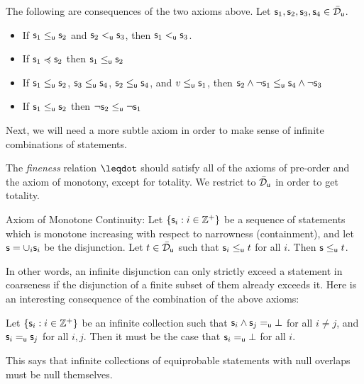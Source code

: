 \documentclass[10pt, onecolumn, longbibliography, nofootinbib]{revtex4-2}
\begin{document}
The following are consequences of the two axioms above. Let $\stmt_1,\stmt_2,\stmt_3,\stmt_4\in \tdomain_{\stmt[u]}$.
\begin{itemize}
    \item If $\stmt_1\leq_{\stmt[u]} \stmt_2$ and $\stmt_2<_{\stmt[u]} \stmt_3$, then $\stmt_1<_{\stmt[u]}\stmt_3$. 
    \item If $\stmt_1\narrower \stmt_2$ then $\stmt_1\leq_{\stmt[u]} \stmt_2$
    \item If $\stmt_1\leq_{\stmt[u]} \stmt_2$, $\stmt_3\leq_{\stmt[u]} \stmt_4$, $\stmt_2\leq_{\stmt[u]} \stmt_4$, and $v\leq_{\stmt[u]} \stmt_1$, then $\stmt_2 \AND \NOT \stmt_1 \leq_{\stmt[u]} \stmt_4 \AND \NOT \stmt_3$
    \item If $\stmt_1\leq_{\stmt[u]} \stmt_2$ then $\NOT \stmt_2 \leq_{\stmt[u]}\NOT \stmt_1$
\end{itemize}

Next, we will need a more subtle axiom in order to make sense of infinite combinations of statements. 

\begin{remark}
The \emph{fineness} relation $\finer$ should satisfy all of the axioms of pre-order and the axiom of monotony, except for totality. We restrict to $\tdomain_{\stmt[u]}$ in order to get totality. 
\end{remark}

Axiom of Monotone Continuity:
Let $\{\stmt_i : i\in \mathbb{Z}^+\}$ be a sequence of statements which is monotone increasing with respect to narrowness (containment), and let $\stmt = \cup_i\stmt_i$ be the disjunction. Let $t\in \tdomain_{\stmt[u]}$ such that $\stmt_i\leq_{\stmt[u]} t$ for all $i$. Then $\stmt\leq_{\stmt[u]} t$. 

In other words, an infinite disjunction can only strictly exceed a statement in coarseness if the disjunction of a finite subset of them already exceeds it. Here is an interesting consequence of the combination of the above axioms:

\begin{prop}
\label{infinitenull}
Let $\{\stmt_i : i\in \mathbb{Z}^+\}$ be an infinite collection such that $\stmt_i\AND\stmt_j =_{\stmt[u]} \impossibility$ for all $i\neq j$, and $\stmt_i =_{\stmt[u]} \stmt_j$ for all $i,j$. Then it must be the case that $\stmt_i=_{\stmt[u]}\impossibility$ for all $i$. 
\end{prop}
This says that infinite collections of equiprobable statements with null overlaps must be null themselves. 
\end{document}
